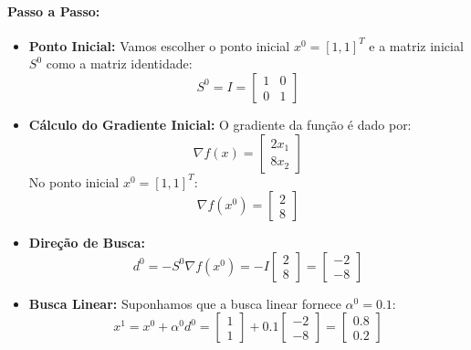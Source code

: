 \documentclass[a4paper, 12pt]{article}
\begin{document}
\paragraph{Passo a Passo:}

\begin{itemize}
    \item \textbf{Ponto Inicial:} Vamos escolher o ponto inicial $x^0 = [1, 1]^T$ e a matriz inicial $S^0$ como a matriz identidade:
    \begin{equation}
    S^0 = I = \begin{bmatrix} 1 & 0 \\ 0 & 1 \end{bmatrix}
    \end{equation}
    
    \item \textbf{Cálculo do Gradiente Inicial:} O gradiente da função é dado por:
    \begin{equation}
    \nabla f(x) = \begin{bmatrix} 2x_1 \\ 8x_2 \end{bmatrix}
    \end{equation}
    No ponto inicial $x^0 = [1, 1]^T$:
    \begin{equation}
    \nabla f(x^0) = \begin{bmatrix} 2 \\ 8 \end{bmatrix}
    \end{equation}
    
    \item \textbf{Direção de Busca:}
    \begin{equation}
    d^0 = - S^0 \nabla f(x^0) = - I \begin{bmatrix} 2 \\ 8 \end{bmatrix} = \begin{bmatrix} -2 \\ -8 \end{bmatrix}
    \end{equation}
    
    \item \textbf{Busca Linear:} Suponhamos que a busca linear fornece $\alpha^0 = 0.1$:
    \begin{equation}
    x^1 = x^0 + \alpha^0 d^0 = \begin{bmatrix} 1 \\ 1 \end{bmatrix} + 0.1 \begin{bmatrix} -2 \\ -8 \end{bmatrix} = \begin{bmatrix} 0.8 \\ 0.2 \end{bmatrix}
    \end{equation}
    

\end{itemize}
\end{document}
